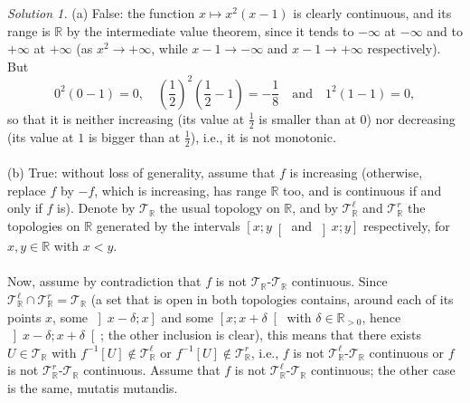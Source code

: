 \begin{solution}
    \textit{Solution 1.}
    (a) False: the function \( x \mapsto x^2\left(x-1\right) \) is clearly continuous, and its range is \( \mathbb{R} \) by the intermediate value theorem, since it tends to \( -\infty \) at \( -\infty \) and to \( +\infty \) at \( +\infty \) (as \( x^2 \to +\infty \), while \( x-1 \to -\infty \) and \( x-1 \to +\infty \) respectively). But
    \[
        0^2\left(0-1\right) = 0, \quad \left(\frac{1}{2}\right)^2\left(\frac{1}{2}-1\right) = -\frac{1}{8} \quad \text{and} \quad 1^2\left(1-1\right) = 0,
    \]
    so that it is neither increasing (its value at \( \frac{1}{2} \) is smaller than at \( 0 \)) nor decreasing (its value at \( 1 \) is bigger than at \( \frac{1}{2} \)), i.e., it is not monotonic.
    \\\\
    (b) True: without loss of generality, assume that \( f \) is increasing (otherwise, replace \( f \) by \( -f \), which is increasing, has range \( \mathbb{R} \) too, and is continuous if and only if \( f \) is). Denote by \( \mathcal{T}_{\mathbb{R}} \) the usual topology on \( \mathbb{R} \), and by \( \mathcal{T}_{\mathbb{R}}^{\ell} \) and \( \mathcal{T}_{\mathbb{R}}^{r} \) the topologies on \( \mathbb{R} \) generated by the intervals \( \left[x;y\right[ \) and \( \left]x;y\right] \) respectively, for \( x, y \in \mathbb{R} \) with \( x < y \).
    \\\\
    Now, assume by contradiction that \( f \) is not \( \mathcal{T}_{\mathbb{R}} \)-\( \mathcal{T}_{\mathbb{R}} \) continuous. Since \( \mathcal{T}_{\mathbb{R}}^{\ell} \cap \mathcal{T}_{\mathbb{R}}^{r} = \mathcal{T}_{\mathbb{R}} \) (a set that is open in both topologies contains, around each of its points \( x \), some \( \left]x-\delta;x\right] \) and some \( \left[x;x+\delta\right[ \) with \( \delta \in \mathbb{R}_{>0} \), hence \( \left]x-\delta;x+\delta\right[ \); the other inclusion is clear), this means that there exists \( U \in \mathcal{T}_{\mathbb{R}} \) with \( f^{-1}\left[U\right] \notin \mathcal{T}_{\mathbb{R}}^{\ell} \) or \( f^{-1}\left[U\right] \notin \mathcal{T}_{\mathbb{R}}^{r} \), i.e., \( f \) is not \( \mathcal{T}_{\mathbb{R}}^{\ell} \)-\( \mathcal{T}_{\mathbb{R}} \) continuous or \( f \) is not \( \mathcal{T}_{\mathbb{R}}^{r} \)-\( \mathcal{T}_{\mathbb{R}} \) continuous. Assume that \( f \) is not \( \mathcal{T}_{\mathbb{R}}^{\ell} \)-\( \mathcal{T}_{\mathbb{R}} \) continuous; the other case is the same, mutatis mutandis.
    \\\\

\end{solution}

